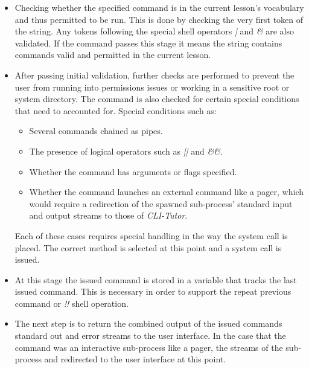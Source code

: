 \begin{itemize}

    \item Checking whether the specified command is in the current lesson's
        vocabulary and thus permitted to be run. This is done by checking the
        very first token of the string. Any tokens following the special shell
        operators \textit{|} and \textit{\&} are also validated. If the command
        passes this stage it means the string contains commands valid and
        permitted in the current lesson.


    \item After passing initial validation, further checks are performed to
        prevent the user from running into permissions issues or working in a
        sensitive root or system directory. The command is also checked for
        certain special conditions that need to accounted for. Special
        conditions such as:

        \begin{itemize}
            \item Several commands chained as pipes.
            \item The presence of logical operators such as \textit{||} and \textit{\&\&}.  
            \item Whether the command has arguments or flags specified.
            \item Whether the command launches an external command like a
                pager, which would require a redirection of the spawned
                sub-process' standard input and output streams to those of
                \textit{CLI-Tutor}.  
        \end{itemize}

        Each of these cases requires special handling in the way the system
        call is placed. The correct method is selected at this point and a
        system call is issued.

    \item At this stage the issued command is stored in a variable that tracks
        the last issued command. This is necessary in order to support the
        repeat previous command or \textit{!!} shell operation.

    \item The next step is to return the combined output of the issued
        commands standard out and error streams to the user interface. In the
        case that the command was an interactive sub-process like a pager, the
        streams of the sub-process and redirected to the user interface at this
        point.


\end{itemize}

